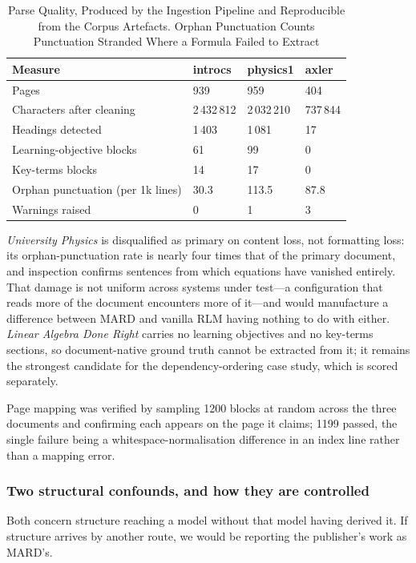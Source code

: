 \documentclass[conference]{IEEEtran}
\begin{document}
\begin{table}[!t]
\caption{Parse Quality, Produced by the Ingestion Pipeline and Reproducible
from the Corpus Artefacts. Orphan Punctuation Counts Punctuation Stranded
Where a Formula Failed to Extract}
\label{tab:parse}
\centering
\renewcommand{\arraystretch}{1.2}
\begin{tabular}{@{}p{3.2cm}R{1.05cm}R{1.05cm}R{0.95cm}@{}}
\toprule
\textbf{Measure} & \textbf{introcs} & \textbf{physics1} & \textbf{axler} \\
\midrule
Pages                              & 939       & 959       & 404 \\
Characters after cleaning          & 2\,432\,812 & 2\,032\,210 & 737\,844 \\
Headings detected                  & 1\,403    & 1\,081    & 17 \\
Learning-objective blocks          & 61        & 99        & 0 \\
Key-terms blocks                   & 14        & 17        & 0 \\
Orphan punctuation (per 1k lines)  & 30.3      & 113.5     & 87.8 \\
Warnings raised                    & 0         & 1         & 3 \\
\bottomrule
\end{tabular}
\end{table}

\emph{University Physics} is disqualified as primary on content loss, not
formatting loss: its orphan-punctuation rate is nearly four times that of the
primary document, and inspection confirms sentences from which equations have
vanished entirely. That damage is not uniform across systems under test---a
configuration that reads more of the document encounters more of it---and
would manufacture a difference between MARD and vanilla RLM having nothing to
do with either. \emph{Linear Algebra Done Right} carries no learning
objectives and no key-terms sections, so document-native ground truth cannot
be extracted from it; it remains the strongest candidate for the
dependency-ordering case study, which is scored separately.

Page mapping was verified by sampling \num{1200} blocks at random across the
three documents and confirming each appears on the page it claims;
\num{1199} passed, the single failure being a whitespace-normalisation
difference in an index line rather than a mapping error.

\subsubsection{Two structural confounds, and how they are controlled}
\label{sec:confounds}
Both concern structure reaching a model without that model having derived it.
If structure arrives by another route, we would be reporting the publisher's
work as MARD's.
\end{document}
